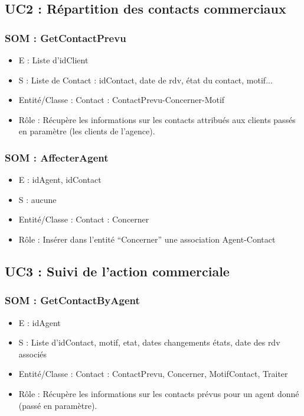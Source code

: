 \subsection{UC2 : Répartition des contacts commerciaux}
\subsubsection{SOM : GetContactPrevu}
	\begin{itemize}
		\item E : Liste d’idClient
		\item S : Liste de Contact : idContact, date de rdv, état du contact, motif...
		\item Entité/Classe : Contact : ContactPrevu-Concerner-Motif
		\item Rôle : Récupère les informations sur les contacts attribués aux clients passés en
	paramètre (les clients de l’agence).
	\end{itemize}

\subsubsection{SOM : AffecterAgent}
	\begin{itemize}
		\item E : idAgent, idContact
		\item S : aucune
		\item Entité/Classe : Contact : Concerner
		\item Rôle : Insérer dans l’entité “Concerner” une association Agent-Contact
	\end{itemize}



\subsection{UC3 : Suivi de l’action commerciale}
\subsubsection{SOM : GetContactByAgent}
	\begin{itemize}
		\item E : idAgent
		\item S : Liste d’idContact, motif, etat, dates changements états, date des rdv associés
		\item Entité/Classe : Contact : ContactPrevu, Concerner, MotifContact, Traiter
		\item Rôle : Récupère les informations sur les contacts prévus pour un agent donné
	(passé en paramètre).
	\end{itemize}




